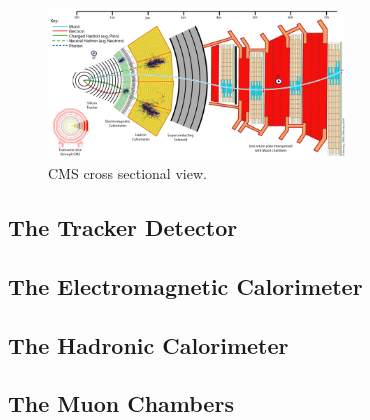 \begin{figure}[!h]
  \centering
  \includegraphics[width=0.7\textwidth]{../images/ch2/cms_cross}
  \caption[CMS cross sectional view]{CMS cross sectional view.}\label{fig:cms_cross}
\end{figure}
\subsection{The Tracker Detector}
\subsection{The Electromagnetic Calorimeter}
\subsection{The Hadronic Calorimeter}
\subsection{The Muon Chambers}





